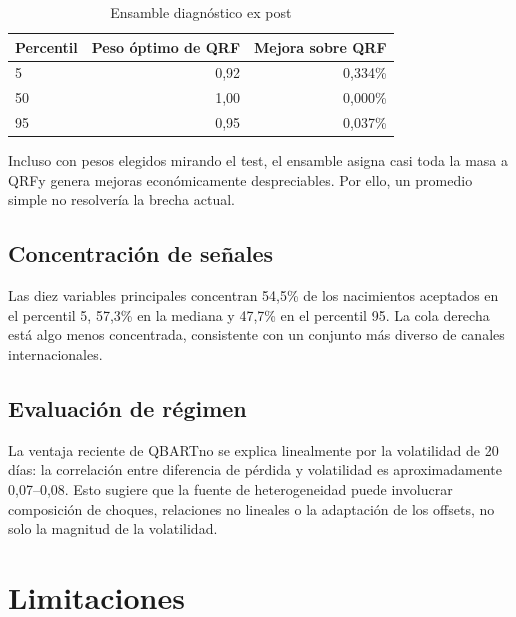\documentclass[11pt,a4paper]{article}
\newcommand{\qbart}{\textsc{QBART}}
\newcommand{\qrf}{\textsc{QRF}}
\begin{document}
\begin{table}[H]
\centering
\caption{Ensamble diagnóstico ex post}
\label{tab:ensemble}
\begin{tabular}{lrr}
\toprule
Percentil & Peso óptimo de QRF & Mejora sobre QRF \\
\midrule
5  & 0,92 & 0,334\% \\
50 & 1,00 & 0,000\% \\
95 & 0,95 & 0,037\% \\
\bottomrule
\end{tabular}
\end{table}

Incluso con pesos elegidos mirando el test, el ensamble asigna casi toda la
masa a \qrf y genera mejoras económicamente despreciables. Por ello, un
promedio simple no resolvería la brecha actual.

\subsection{Concentración de señales}

Las diez variables principales concentran 54,5\% de los nacimientos
aceptados en el percentil 5, 57,3\% en la mediana y 47,7\% en el percentil
95. La cola derecha está algo menos concentrada, consistente con un conjunto
más diverso de canales internacionales.

\subsection{Evaluación de régimen}

La ventaja reciente de \qbart no se explica linealmente por la volatilidad
de 20 días: la correlación entre diferencia de pérdida y volatilidad es
aproximadamente 0,07--0,08. Esto sugiere que la fuente de heterogeneidad
puede involucrar composición de choques, relaciones no lineales o la
adaptación de los offsets, no solo la magnitud de la volatilidad.

\section{Limitaciones}
\end{document}
